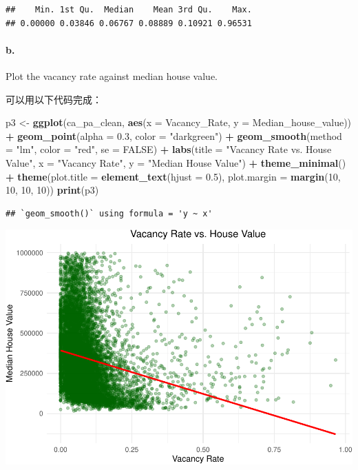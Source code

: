 \documentclass[
]{article}
\newenvironment{Shaded}{\begin{snugshade}}{\end{snugshade}}
\newcommand{\AttributeTok}[1]{\textcolor[rgb]{0.13,0.29,0.53}{#1}}
\newcommand{\ConstantTok}[1]{\textcolor[rgb]{0.56,0.35,0.01}{#1}}
\newcommand{\DecValTok}[1]{\textcolor[rgb]{0.00,0.00,0.81}{#1}}
\newcommand{\FloatTok}[1]{\textcolor[rgb]{0.00,0.00,0.81}{#1}}
\newcommand{\FunctionTok}[1]{\textcolor[rgb]{0.13,0.29,0.53}{\textbf{#1}}}
\newcommand{\NormalTok}[1]{#1}
\newcommand{\OtherTok}[1]{\textcolor[rgb]{0.56,0.35,0.01}{#1}}
\newcommand{\SpecialCharTok}[1]{\textcolor[rgb]{0.81,0.36,0.00}{\textbf{#1}}}
\newcommand{\StringTok}[1]{\textcolor[rgb]{0.31,0.60,0.02}{#1}}
\begin{document}
\begin{verbatim}
##    Min. 1st Qu.  Median    Mean 3rd Qu.    Max. 
## 0.00000 0.03846 0.06767 0.08889 0.10921 0.96531
\end{verbatim}

\paragraph{b.}\label{b.-2}

Plot the vacancy rate against median house value.

可以用以下代码完成：

\begin{Shaded}
\begin{Highlighting}[]
\NormalTok{p3 }\OtherTok{\textless{}{-}} \FunctionTok{ggplot}\NormalTok{(ca\_pa\_clean, }\FunctionTok{aes}\NormalTok{(}\AttributeTok{x =}\NormalTok{ Vacancy\_Rate, }\AttributeTok{y =}\NormalTok{ Median\_house\_value)) }\SpecialCharTok{+}
  \FunctionTok{geom\_point}\NormalTok{(}\AttributeTok{alpha =} \FloatTok{0.3}\NormalTok{, }\AttributeTok{color =} \StringTok{"darkgreen"}\NormalTok{) }\SpecialCharTok{+}
  \FunctionTok{geom\_smooth}\NormalTok{(}\AttributeTok{method =} \StringTok{"lm"}\NormalTok{, }\AttributeTok{color =} \StringTok{"red"}\NormalTok{, }\AttributeTok{se =} \ConstantTok{FALSE}\NormalTok{) }\SpecialCharTok{+}
  \FunctionTok{labs}\NormalTok{(}\AttributeTok{title =} \StringTok{"Vacancy Rate vs. House Value"}\NormalTok{,}
       \AttributeTok{x =} \StringTok{"Vacancy Rate"}\NormalTok{, }
       \AttributeTok{y =} \StringTok{"Median House Value"}\NormalTok{) }\SpecialCharTok{+}
  \FunctionTok{theme\_minimal}\NormalTok{() }\SpecialCharTok{+}
  \FunctionTok{theme}\NormalTok{(}\AttributeTok{plot.title =} \FunctionTok{element\_text}\NormalTok{(}\AttributeTok{hjust =} \FloatTok{0.5}\NormalTok{),}
        \AttributeTok{plot.margin =} \FunctionTok{margin}\NormalTok{(}\DecValTok{10}\NormalTok{, }\DecValTok{10}\NormalTok{, }\DecValTok{10}\NormalTok{, }\DecValTok{10}\NormalTok{))}
\FunctionTok{print}\NormalTok{(p3)}
\end{Highlighting}
\end{Shaded}

\begin{verbatim}
## `geom_smooth()` using formula = 'y ~ x'
\end{verbatim}

\includegraphics{Homework-02_files/figure-latex/unnamed-chunk-9-1.pdf}
\end{document}
